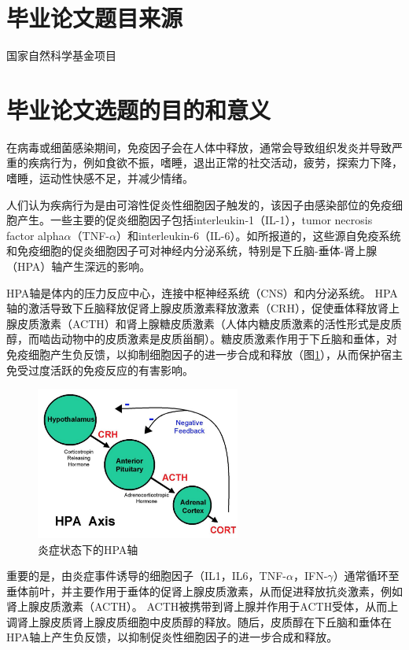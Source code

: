\documentclass[class = opening]{whuthesis}
\begin{document}
\section{毕业论文题目来源}
国家自然科学基金项目

\section{毕业论文选题的目的和意义}
  在病毒或细菌感染期间，免疫因子会在人体中释放，通常会导致组织发炎并导致严重的疾病行为，例如食欲不振，嗜睡，退出正常的社交活动，疲劳，探索力下降，嗜睡，运动性快感不足，并减少情绪。

  人们认为疾病行为是由可溶性促炎性细胞因子触发的，该因子由感染部位的免疫细胞产生。一些主要的促炎细胞因子包括interleukin-1（IL-1），tumor necrosis factor alpha$\alpha$（TNF-$\alpha$）和interleukin-6（IL-6）。如所报道的，这些源自免疫系统和免疫细胞的促炎细胞因子可对神经内分泌系统，特别是下丘脑-垂体-肾上腺（HPA）轴产生深远的影响。

  HPA轴是体内的压力反应中心，连接中枢神经系统（CNS）和内分泌系统。 HPA轴的激活导致下丘脑释放促肾上腺皮质激素释放激素（CRH），促使垂体释放肾上腺皮质激素（ACTH）和肾上腺糖皮质激素（人体内糖皮质激素的活性形式是皮质醇，而啮齿动物中的皮质激素是皮质甾酮）。糖皮质激素作用于下丘脑和垂体，对免疫细胞产生负反馈，以抑制细胞因子的进一步合成和释放（图\ref{fig:HPA}），从而保护宿主免受过度活跃的免疫反应的有害影响。

\begin{figure}[!htb]
  \centering
  \includegraphics[width=0.6\textwidth]{figs/HPA.png}
  \caption{炎症状态下的HPA轴}
  \label{fig:HPA}
\end{figure}

  重要的是，由炎症事件诱导的细胞因子（IL1，IL6，TNF-$\alpha$，IFN-$\gamma$）通常循环至垂体前叶，并主要作用于垂体的促肾上腺皮质激素，从而促进释放抗炎激素，例如肾上腺皮质激素（ACTH）。 ACTH被携带到肾上腺并作用于ACTH受体，从而上调肾上腺皮质肾上腺皮质细胞中皮质醇的释放。随后，皮质醇在下丘脑和垂体在HPA轴上产生负反馈，以抑制促炎性细胞因子的进一步合成和释放。
\end{document}
